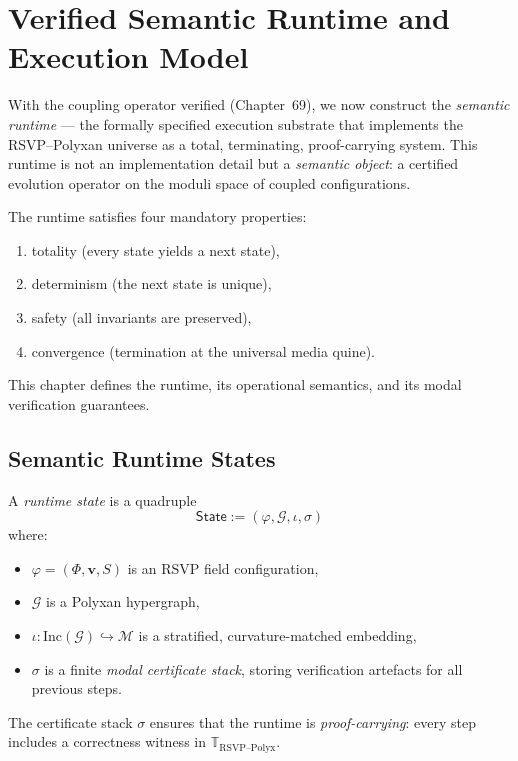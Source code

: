 \chapter{Verified Semantic Runtime and Execution Model}
\label{ch:70}

With the coupling operator verified (Chapter~69), we now construct the 
\emph{semantic runtime} --- the formally specified execution substrate that 
implements the RSVP--Polyxan universe as a total, terminating, proof-carrying 
system.  
This runtime is not an implementation detail but a \emph{semantic object}:  
a certified evolution operator on the moduli space of coupled configurations.

The runtime satisfies four mandatory properties:
\begin{enumerate}
\item totality (every state yields a next state),
\item determinism (the next state is unique),
\item safety (all invariants are preserved),
\item convergence (termination at the universal media quine).
\end{enumerate}

This chapter defines the runtime, its operational semantics, and its modal 
verification guarantees.

\section{Semantic Runtime States}

\begin{definition}
A \emph{runtime state} is a quadruple
\[
\mathsf{State}
  := (\varphi,\mathcal{G},\iota,\sigma)
\]
where:
\begin{itemize}
\item $\varphi=(\Phi,\mathbf{v},S)$ is an RSVP field configuration,
\item $\mathcal{G}$ is a Polyxan hypergraph,
\item $\iota : \mathrm{Inc}(\mathcal{G}) \hookrightarrow \mathcal{M}$ is a 
      stratified, curvature-matched embedding,
\item $\sigma$ is a finite \emph{modal certificate stack},
      storing verification artefacts for all previous steps.
\end{itemize}
\end{definition}

The certificate stack $\sigma$ ensures that the runtime is \emph{proof-carrying}:
every step includes a correctness witness in $\mathbb{T}_{\mathrm{RSVP\text{--}Polyx}}$.


